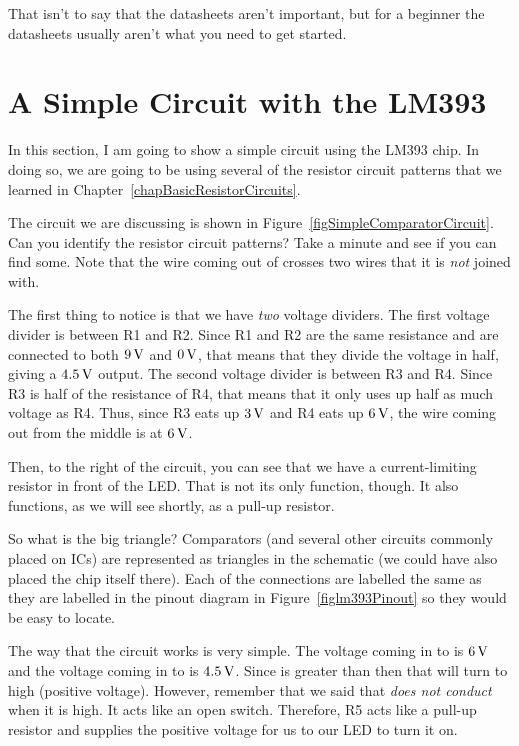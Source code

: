 That isn't to say that the datasheets aren't important, but for a beginner the datasheets usually aren't what you need to get started.

\section{A Simple Circuit with the LM393}

In this section, I am going to show a simple circuit using the LM393 chip.
In doing so, we are going to be using several of the resistor circuit patterns that we learned in Chapter~\ref{chapBasicResistorCircuits}.


The circuit we are discussing is shown in Figure~\ref{figSimpleComparatorCircuit}.
Can you identify the resistor circuit patterns?  
Take a minute and see if you can find some.
Note that the wire coming out of  crosses two wires that it is \emph{not} joined with.

The first thing to notice is that we have \emph{two} voltage dividers.
The first voltage divider is between R1 and R2.
Since R1 and R2 are the same resistance and are connected to both $9\,\si{\volt}$ and $0\,\si{\volt}$, that means that they divide the voltage in half, giving a $4.5\,\si{\volt}$ output.
The second voltage divider is between R3 and R4.
Since R3 is half of the resistance of R4, that means that it only uses up half as much voltage as R4.  
Thus, since R3 eats up $3\,\si{\volt}$ and R4 eats up $6\,\si{\volt}$, the wire coming out from the middle is at $6\,\si{\volt}$.

Then, to the right of the circuit, you can see that we have a current-limiting resistor in front of the LED.
That is not its only function, though.
It also functions, as we will see shortly, as a pull-up resistor.

So what is the big triangle?
Comparators (and several other circuits commonly placed on ICs) are represented as triangles in the schematic (we could have also placed the chip itself there).
Each of the connections are labelled the same as they are labelled in the pinout diagram in Figure~\ref{figlm393Pinout} so they would be easy to locate.

The way that the circuit works is very simple.
The voltage coming in to  is $6\,\si{\volt}$ and the voltage coming in to  is $4.5\,\si{\volt}$.
Since  is greater than  then that will turn  to high (positive voltage).
However, remember that we said that  \emph{does not conduct} when it is high.
It acts like an open switch.
Therefore, R5 acts like a pull-up resistor and supplies the positive voltage for us to our LED to turn it on.

